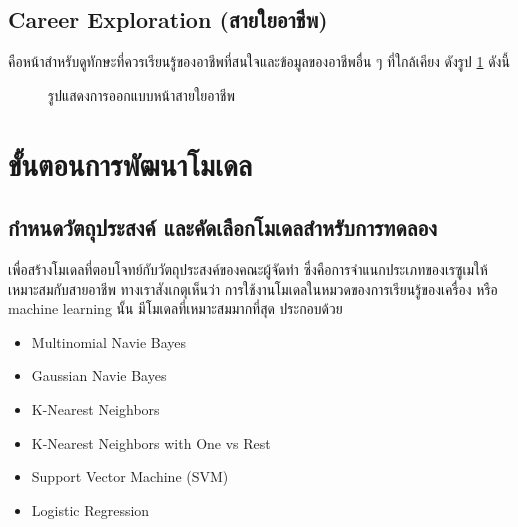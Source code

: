 \subsection{Career Exploration (สายใยอาชีพ)}
คือหน้าสำหรับดูทักษะที่ควรเรียนรู้ของอาชีพที่สนใจและข้อมูลของอาชีพอื่น ๆ ที่ใกล้เคียง ดังรูป \ref{fig:CE.png} ดังนี้
\begin{figure}[H]\centering
    \caption{รูปแสดงการออกแบบหน้าสายใยอาชีพ}\label{fig:CE.png}
\end{figure}

\section{ขั้นตอนการพัฒนาโมเดล}
\subsection{กำหนดวัตถุประสงค์ และคัดเลือกโมเดลสำหรับการทดลอง}
เพื่อสร้างโมเดลที่ตอบโจทย์กับวัตถุประสงค์ของคณะผู้จัดทำ ซึ่งคือการจำแนกประเภทของเรซูเมให้เหมาะสมกับสายอาชีพ ทางเราสังเกตุเห็นว่า การใช้งานโมเดลในหมวดของการเรียนรู้ของเครื่อง หรือ machine learning นั้น มีโมเดลที่เหมาะสมมากที่สุด ประกอบด้วย
\begin{itemize}
    \item Multinomial Navie Bayes
    \item Gaussian Navie Bayes
    \item K-Nearest Neighbors
    \item K-Nearest Neighbors with One vs Rest
    \item Support Vector Machine (SVM)
    \item Logistic Regression
\end{itemize}

